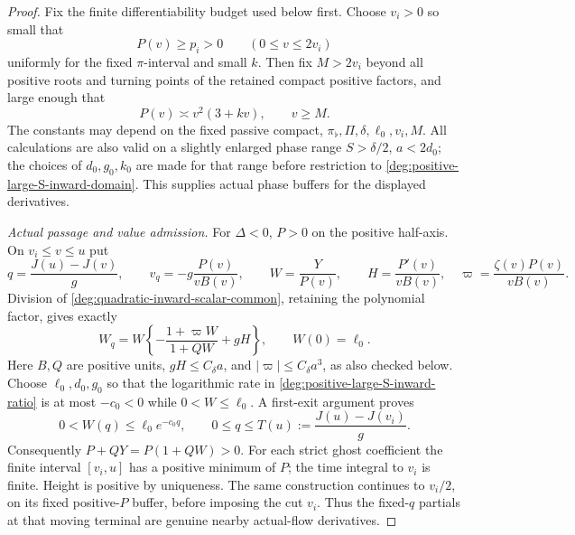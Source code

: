 \begin{proof}
Fix the finite differentiability budget used below first.
Choose \(v_i>0\) so small that
\[
 P(v)\ge p_i>0\qquad(0\le v\le2v_i)
\]
uniformly for the fixed \(\pi\)-interval and small \(k\).
Then fix \(M>2v_i\) beyond all positive roots and turning points of
the retained compact positive factors, and large enough that
\begin{equation}\label{deg:positive-large-S-inward-growing-polynomial}
 P(v)\asymp v^2(3+kv),\qquad v\ge M .
\end{equation}
The constants may depend on the fixed passive compact,
\(\pi_\flat,\Pi,\delta,\ell_0,v_i,M\).
All calculations are also valid on a slightly enlarged phase range
\(S>\delta/2\), \(a<2d_0\); the choices of \(d_0,g_0,k_0\) are made
for that range before restriction to \eqref{deg:positive-large-S-inward-domain}.
This supplies actual phase buffers for the displayed derivatives.

\smallskip
\noindent\emph{Actual passage and value admission.}
For \(\Delta<0\), \(P>0\) on the positive half-axis.
On \(v_i\le v\le u\) put
\begin{equation}\label{deg:positive-large-S-inward-action-variable}
 q=\frac{J(u)-J(v)}g,\qquad
 v_q=-g\frac{P(v)}{vB(v)},\qquad
 W=\frac{Y}{P(v)},\qquad
 H=\frac{P'(v)}{vB(v)},\quad
 \varpi=\frac{\zeta(v)P(v)}{vB(v)} .
\end{equation}
Division of \eqref{deg:quadratic-inward-scalar-common}, retaining the polynomial factor, gives
exactly
\begin{equation}\label{deg:positive-large-S-inward-ratio}
 W_q=W\left\{-\frac{1+\varpi W}{1+QW}+gH\right\},
 \qquad W(0)=\ell_0 .
\end{equation}
Here \(B,Q\) are positive units, \(gH\le C_\delta a\), and
\(|\varpi|\le C_\delta a^3\), as also checked below.
Choose \(\ell_0,d_0,g_0\) so that the logarithmic rate in
\eqref{deg:positive-large-S-inward-ratio} is at most \(-c_0<0\) while \(0<W\le\ell_0\).
A first-exit argument proves
\begin{equation}\label{deg:positive-large-S-inward-value-decay}
 0<W(q)\le\ell_0e^{-c_0q},\qquad
 0\le q\le T(u):=\frac{J(u)-J(v_i)}g .
\end{equation}
Consequently \(P+QY=P(1+QW)>0\). For each strict ghost coefficient
the finite interval \([v_i,u]\) has a positive minimum of \(P\);
the time integral to \(v_i\) is finite. Height is positive by
uniqueness. The same construction continues to \(v_i/2\), on its
fixed positive-\(P\) buffer, before imposing the cut \(v_i\).
Thus the fixed-\(q\) partials at that moving terminal are genuine
nearby actual-flow derivatives.


\end{proof}
